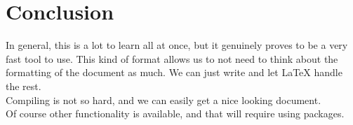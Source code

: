 \documentclass{article}
\begin{document}
\section{Conclusion}

In general, this is a lot to learn all at once, but it genuinely proves to be a very fast tool to use.
This kind of format allows us to not need to think about the formatting of the document as much. We can just write and let LaTeX handle the rest.\\
Compiling is not so hard, and we can easily get a nice looking document.\\
Of course other functionality is available, and that will require using packages.
\end{document}
